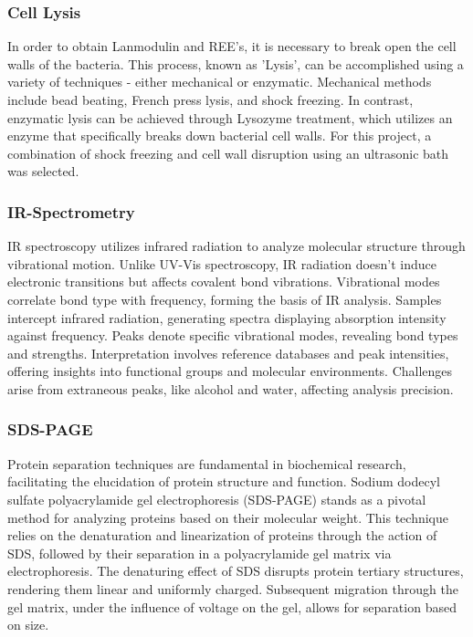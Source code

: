 \subsubsection{Cell Lysis\authorB{}}
In order to obtain Lanmodulin and REE's, it is necessary to break open the cell walls of the
bacteria. This process, known as 'Lysis', can be accomplished using a variety of techniques -
either mechanical or enzymatic. Mechanical methods include bead beating, French press
lysis, and shock freezing. In contrast, enzymatic lysis can be achieved through Lysozyme
treatment, which utilizes an enzyme that specifically breaks down bacterial cell walls. For this
project, a combination of shock freezing and cell wall disruption using an ultrasonic bath was
selected.

\subsubsection{IR-Spectrometry\authorB}
IR spectroscopy utilizes infrared radiation to analyze molecular structure through vibrational
motion. Unlike UV-Vis spectroscopy, IR radiation doesn't induce electronic transitions but
affects covalent bond vibrations. Vibrational modes correlate bond type with frequency,
forming the basis of IR analysis. Samples intercept infrared radiation, generating spectra
displaying absorption intensity against frequency. Peaks denote specific vibrational modes,
revealing bond types and strengths. Interpretation involves reference databases and peak
intensities, offering insights into functional groups and molecular environments. Challenges
arise from extraneous peaks, like alcohol and water, affecting analysis precision.

\subsubsection{SDS-PAGE\authorB{}}
Protein separation techniques are fundamental in biochemical research, facilitating the
elucidation of protein structure and function. Sodium dodecyl sulfate polyacrylamide gel
electrophoresis (SDS-PAGE) stands as a pivotal method for analyzing proteins based on their
molecular weight. This technique relies on the denaturation and linearization of proteins
through the action of SDS, followed by their separation in a polyacrylamide gel matrix via
electrophoresis. The denaturing effect of SDS disrupts protein tertiary structures, rendering
them linear and uniformly charged. Subsequent migration through the gel matrix, under the
influence of voltage on the gel, allows for separation based on size.